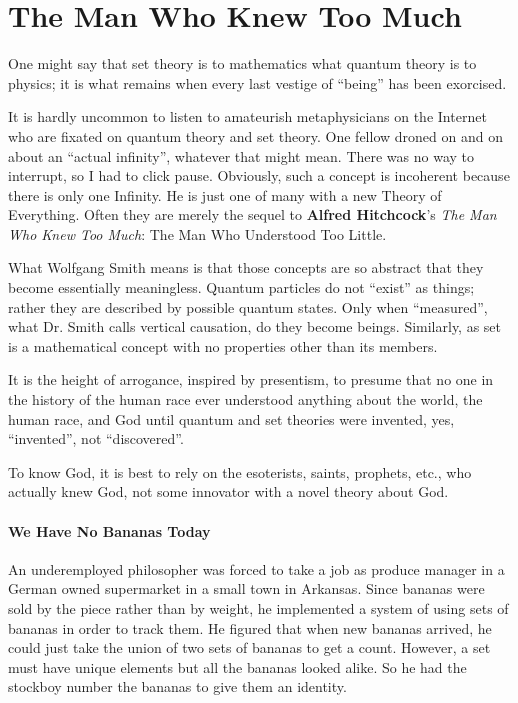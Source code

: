 \section{The Man Who Knew Too Much}

\begin{quotex}
One might say that set theory is to mathematics what quantum theory is to physics; it is what remains when every last vestige of ``being'' has been exorcised.
\end{quotex}


It is hardly uncommon to listen to amateurish metaphysicians on the Internet who are fixated on quantum theory and set theory. One fellow droned on and on about an ``actual infinity'', whatever that might mean. There was no way to interrupt, so I had to click pause. Obviously, such a concept is incoherent because there is only one Infinity. He is just one of many with a new Theory of Everything. Often they are merely the sequel to \textbf{Alfred Hitchcock}'s \emph{The Man Who Knew Too Much}: The Man Who Understood Too Little.

What Wolfgang Smith means is that those concepts are so abstract that they become essentially meaningless. Quantum particles do not ``exist'' as things; rather they are described by possible quantum states. Only when ``measured'', what Dr. Smith calls vertical causation, do they become beings. Similarly, as set is a mathematical concept with no properties other than its members.

It is the height of arrogance, inspired by presentism, to presume that no one in the history of the human race ever understood anything about the world, the human race, and God until quantum and set theories were invented, yes, ``invented'', not ``discovered''.

To know God, it is best to rely on the esoterists, saints, prophets, etc., who actually knew God, not some innovator with a novel theory about God.

\paragraph{We Have No Bananas Today}


An underemployed philosopher was forced to take a job as produce manager in a German owned supermarket in a small town in Arkansas. Since bananas were sold by the piece rather than by weight, he implemented a system of using sets of bananas in order to track them. He figured that when new bananas arrived, he could just take the union of two sets of bananas to get a count. However, a set must have unique elements but all the bananas looked alike. So he had the stockboy number the bananas to give them an identity.

